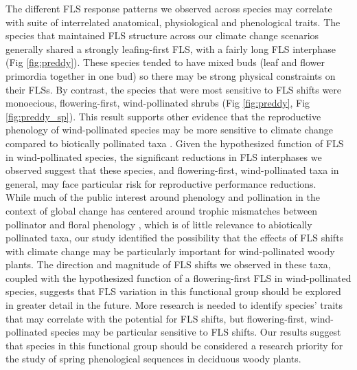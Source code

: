 \documentclass[11pt]{article}\usepackage[]{graphicx}\usepackage[]{color}
\begin{document}
\noindent The different FLS response patterns we observed across species may correlate with suite of interrelated anatomical, physiological and phenological traits. The species that maintained FLS structure across our climate change scenarios generally shared a strongly leafing-first FLS, with a fairly long FLS interphase (Fig \ref{fig:preddy}). These species tended to have mixed buds (leaf and flower primordia together in one bud) so there may be strong physical constraints on their FLSs. By contrast, the species that were most sensitive to FLS shifts were monoecious, flowering-first, wind-pollinated shrubs (Fig \ref{fig:preddy}, Fig \ref{fig:preddy_sp}). This result supports other evidence that the reproductive phenology of wind-pollinated species may be more sensitive to climate change compared to biotically pollinated taxa \citep{Ziello:2012aa}. Given the hypothesized function of FLS in wind-pollinated species, the significant reductions in FLS interphases we observed suggest that these species, and flowering-first, wind-pollinated taxa in general, may face particular risk for reproductive performance reductions.\\

\noindent While much of the public interest around phenology and pollination in the context of global change has centered around trophic mismatches between pollinator and floral phenology \citep{Memmott2007}, which is of little relevance to abiotically pollinated taxa, our study identified the possibility that the effects of FLS shifts with climate change may be particularly important for wind-pollinated woody plants. The direction and magnitude of FLS shifts we observed in these taxa, coupled with the hypothesized function of a flowering-first FLS in wind-pollinated species, suggests that FLS variation in this functional group should be explored in greater detail in the future. More research is needed to identify species' traits that may correlate with the potential for FLS shifts, but flowering-first, wind-pollinated species may be particular sensitive to FLS shifts. Our results suggest that species in this functional group should be considered a research priority for the study of spring phenological sequences in deciduous woody plants.\\ 


 
\end{document}
